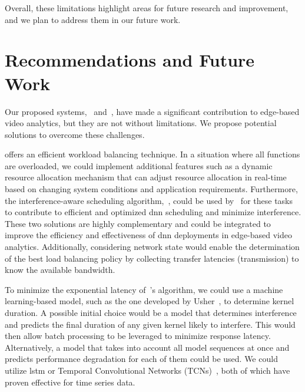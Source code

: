 Overall, these limitations highlight areas for future research and improvement, and we plan to address them in our future work.

\section{Recommendations and Future Work}

Our proposed systems,~\videojam{} and~\roomie{}, have made a significant contribution to edge-based video analytics, but they are not without limitations. We propose potential solutions to overcome these challenges.

\videojam{} offers an efficient workload balancing technique. In a situation where all functions are overloaded, we could implement additional features such as a dynamic resource allocation mechanism that can adjust resource allocation in real-time based on changing system conditions and application requirements. Furthermore, the interference-aware scheduling algorithm,~\roomie{}, could be used by~\videojam{} for these tasks to contribute to efficient and optimized \acrshort{dnn} scheduling and minimize interference. These two solutions are highly complementary and could be integrated to improve the efficiency and effectiveness of \acrshort{dnn} deployments in edge-based video analytics. Additionally, considering network state would enable the determination of the best load balancing policy by collecting transfer latencies (transmission) to know the available bandwidth.

To minimize the exponential latency of~\roomie{}'s algorithm, we could use a machine learning-based model, such as the one developed by Usher~\cite{shubha2024usher}, to determine kernel duration. A possible initial choice would be a model that determines interference and predicts the final duration of any given kernel likely to interfere. This would then allow batch processing to be leveraged to minimize response latency. Alternatively, a model that takes into account all model sequences at once and predicts performance degradation for each of them could be used. We could utilize \acrfull{lstm} or Temporal Convolutional Networks (TCNs)~\cite{KerasTCN}, both of which have proven effective for time series data.


